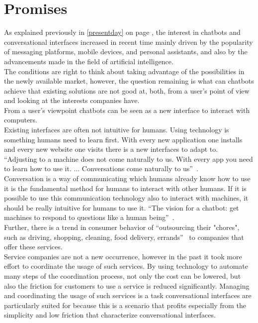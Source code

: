 \section{Promises}


As explained previously in \ref{presentday} on page \pageref{presentday}, the interest in chatbots and conversational interfaces increased in recent time mainly driven by the popularity of messaging platforms, mobile devices, and personal assistants, and also by the advancements made in the field of artificial intelligence.
\\
The conditions are right to think about taking advantage of the possibilities in the newly available market, however, the question remaining is what can chatbots achieve that existing solutions are not good at, both, from a user's point of view and looking at the interests companies have.
\\

From a user's viewpoint chatbots can be seen as a new interface to interact with computers.
\\
Existing interfaces are often not intuitive for humans.
Using technology is something humans need to learn first.
With every new application one installs and every new website one visits there is a new interfaces to adapt to.
\\
``Adjusting to a machine does not come naturally to us. With every app you need to learn how to use it. ... Conversations come naturally to us''~\cite{techinasia}.
\\
Conversation is a way of communicating which humans already know how to use it is the fundamental method for humans to interact with other humans.
If it is possible to use this communication technology also to interact with machines, it should be really intuitive for humans to use it.
``The vision for a chatbot: get machines to respond to questions like a human being''~\cite{techinasia}.
\\

Further, there is a trend in consumer behavior of ``outsourcing their "chores", such as driving, shopping, cleaning, food delivery, errands''~\cite{chatbotbook} to companies that offer these services.
\\
Service companies are not a new occurrence, however in the past it took more effort to coordinate the usage of such services.
By using technology to automate many steps of the coordination process, not only the cost can be lowered,
but also the friction for customers to use a service is reduced significantly.
Managing and coordinating the usage of such services is a task conversational interfaces are particularly suited for because this is a scenario that profits especially from the simplicity and low friction that characterize conversational interfaces.
\\

